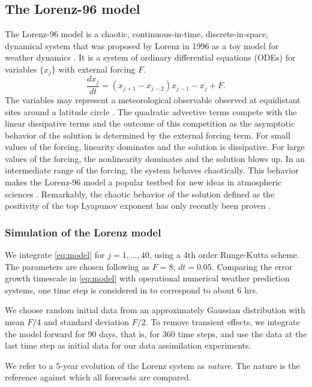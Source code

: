\documentclass[10pt]{article}
\newcommand \be {\begin{equation}}
\newcommand \ee {\end{equation}}
\begin{document}
\subsection{The Lorenz-96 model}
The Lorenz-96 model is a chaotic, continuous-in-time, discrete-in-space, dynamical system that was proposed by Lorenz in 1996 as a toy model for weather dynamics \cite{Lorenz96}. It is a system of ordinary differential equations (ODEs) for variables $\{x_j\}$ with external forcing $F$. 
\be \label{eq:model} \frac{dx_j}{dt} = ( x_{j+1} - x_{j-2} ) x_{j-1} - x_j + F. \ee
The variables may represent a meteorological observable observed at equidistant sites around a latitude circle \cite{LorenzEmanuel98}. The quadratic advective terms compete with the linear dissipative terms and the outcome of this competition as the asymptotic behavior of the solution is determined by the external forcing term. For small values of the forcing, linearity dominates and the solution is dissipative. For large values of the forcing, the nonlinearity dominates and the solution blows up. In an intermediate range of the forcing, the system behaves chaotically. This behavior makes the Lorenz-96 model a popular testbed for new ideas in atmospheric sciences \cite{LorenzEmanuel98,Boffetta02,Ott04,Pazo08, Karimi10, Majda17}. Remarkably, the chaotic behavior of the solution defined as the positivity of the top Lyapunov exponent has only recently been proven \cite{Bedrossian20}. 

\subsubsection{Simulation of the Lorenz model}

We integrate \eqref{eq:model} for $j=1,\dots,40$, using a 4th order Runge-Kutta scheme. The parameters are chosen following \cite{LorenzEmanuel98} as $F=8$, $dt = 0.05$. Comparing the error growth timescale in \eqref{eq:model} with operational numerical weather prediction systems, one time step is considered in \cite{LorenzEmanuel98} to correspond to about 6 hrs. 

We choose random initial data from an approximately Gaussian distribution with mean $F/4$ and standard deviation $F/2$. To remove transient effects, we integrate the model forward for 90 days, that is, for $360$ time steps, and use the data at the last time step as initial data for our data assimilation experiments.

We refer to a 5-year evolution of the Lorenz system as {\it nature}. The nature is the reference against which all forecasts are compared. 
\end{document}
